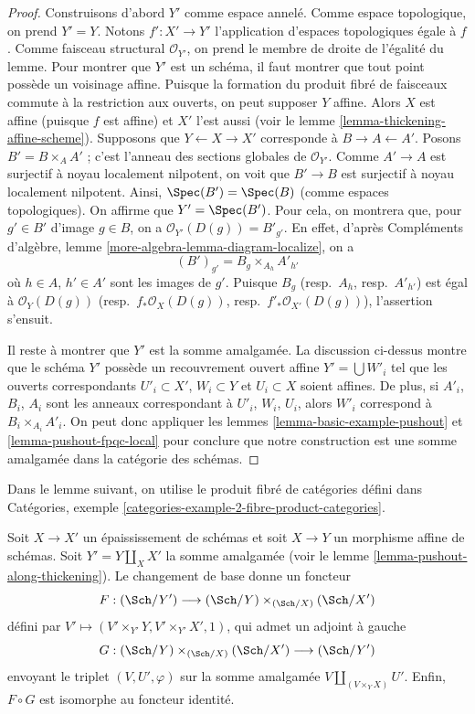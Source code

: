 \begin{proof}
Construisons d'abord $Y'$ comme espace annelé. Comme espace
topologique, on prend $Y' = Y$. Notons $f' : X' \to Y'$ l'application d'espaces topologiques
égale à $f$. Comme faisceau structural $\mathcal{O}_{Y'}$, on prend
le membre de droite de l'égalité du lemme. Pour montrer que
$Y'$ est un schéma, il faut montrer que tout point possède un voisinage
affine. Puisque la formation du produit fibré de faisceaux
commute à la restriction aux ouverts, on peut supposer $Y$ affine.
Alors $X$ est affine (puisque $f$ est affine) et $X'$ l'est aussi
(voir le lemme \ref{lemma-thickening-affine-scheme}).
Supposons que $Y \leftarrow X \rightarrow X'$ corresponde
à $B \rightarrow A \leftarrow A'$. Posons $B' = B \times_A A'$ ;
c'est l'anneau des sections globales de $\mathcal{O}_{Y'}$. Comme $A' \to A$ est surjectif
à noyau localement nilpotent, on voit que $B' \to B$ est surjectif
à noyau localement nilpotent. Ainsi, $\Spec(B') = \Spec(B)$ (comme
espaces topologiques). On affirme que $Y' = \Spec(B')$. Pour cela,
on montrera que, pour $g' \in B'$ d'image $g \in B$,
on a $\mathcal{O}_{Y'}(D(g)) = B'_{g'}$. En effet, d'après
Compléments d'algèbre, lemme \ref{more-algebra-lemma-diagram-localize}, on a
$$
(B')_{g'} = B_g \times_{A_h} A'_{h'}
$$
où $h \in A$, $h' \in A'$ sont les images de $g'$. Puisque
$B_g$ (resp.\ $A_h$, resp.\ $A'_{h'}$) est égal à $\mathcal{O}_Y(D(g))$
(resp.\ $f_*\mathcal{O}_X(D(g))$, resp.\ $f'_*\mathcal{O}_{X'}(D(g))$),
l'assertion s'ensuit.

\medskip\noindent
Il reste à montrer que $Y'$ est la somme amalgamée.
La discussion ci-dessus montre que le schéma $Y'$
possède un recouvrement ouvert affine $Y' = \bigcup W'_i$
tel que les ouverts correspondants
$U'_i \subset X'$, $W_i \subset Y$ et
$U_i \subset X$ soient affines.
De plus, si $A'_i$, $B_i$, $A_i$ sont les anneaux correspondant à
$U'_i$, $W_i$, $U_i$, alors
$W'_i$ correspond à $B_i \times_{A_i} A'_i$.
On peut donc appliquer les lemmes \ref{lemma-basic-example-pushout} et
\ref{lemma-pushout-fpqc-local} pour conclure que notre construction est une somme amalgamée
dans la catégorie des schémas.
\end{proof}

\noindent
Dans le lemme suivant, on utilise le produit fibré de catégories
défini dans
Catégories, exemple \ref{categories-example-2-fibre-product-categories}.

\begin{lemma}
\label{lemma-equivalence-categories-schemes-over-pushout}
Soit $X \to X'$ un épaississement de schémas et soit $X \to Y$ un
morphisme affine de schémas. Soit $Y' = Y \amalg_X X'$ la somme amalgamée
(voir le lemme \ref{lemma-pushout-along-thickening}). Le changement de base donne
un foncteur
$$
F : (\Sch/Y') \longrightarrow (\Sch/Y) \times_{(\Sch/X)} (\Sch/X')
$$
défini par $V' \longmapsto (V' \times_{Y'} Y, V' \times_{Y'} X', 1)$,
qui admet un adjoint à gauche
$$
G : (\Sch/Y) \times_{(\Sch/X)} (\Sch/X') \longrightarrow (\Sch/Y')
$$
envoyant le triplet $(V, U', \varphi)$ sur la somme amalgamée
$V \amalg_{(V \times_Y X)} U'$. Enfin, $F \circ G$ est isomorphe au
foncteur identité.
\end{lemma}

